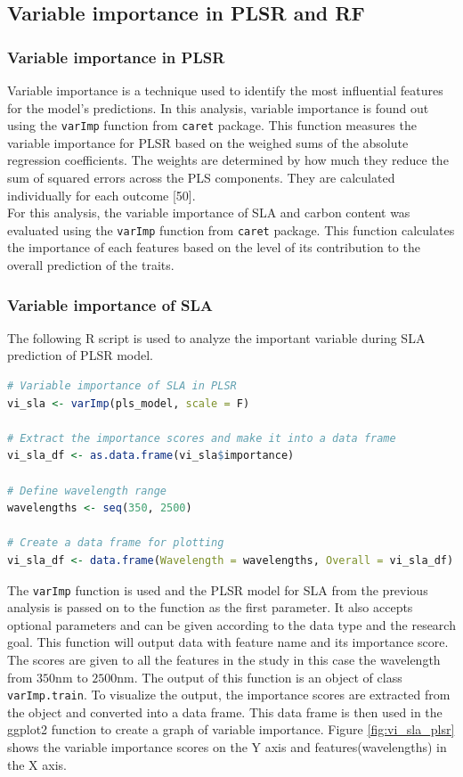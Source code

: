 \documentclass[12pt,a4paper]{report}
\begin{document}
\subsection{Variable importance in PLSR and RF}
\subsubsection*{Variable importance in PLSR}
Variable importance is a technique used to identify the most influential features for the model's predictions. In this analysis, variable importance is found out using the \texttt{varImp} function from \texttt{caret} package. This function measures the variable importance for PLSR based on the weighed sums of the absolute regression coefficients. The weights are determined by how much they reduce the sum of squared errors across the PLS components. They are calculated individually for each outcome [50].\\

For this analysis, the variable importance of SLA and carbon content was evaluated using the \texttt{varImp} function from \texttt{caret} package. This function calculates the importance of each features based on the level of its contribution to the overall prediction of the traits. \\ 

\subsubsection*{Variable importance of SLA}
The following R script is used to analyze the important variable during SLA prediction of PLSR model. \\

\begin{lstlisting}[language=R, style=mystyle]
# Variable importance of SLA in PLSR
vi_sla <- varImp(pls_model, scale = F)

# Extract the importance scores and make it into a data frame
vi_sla_df <- as.data.frame(vi_sla$importance)

# Define wavelength range
wavelengths <- seq(350, 2500)

# Create a data frame for plotting
vi_sla_df <- data.frame(Wavelength = wavelengths, Overall = vi_sla_df)
\end{lstlisting}

The \texttt{varImp} function is used and the PLSR model for SLA from the previous analysis is passed on to the function as the first parameter. It also accepts optional parameters and can be given according to the data type and the research goal. This function will output data with feature name and its importance score. The scores are given to all the features in the study in this case the wavelength from $350$nm to $2500$nm. The output of this function is an object of class \texttt{varImp.train}. To visualize the output, the importance scores are extracted from the object and converted into a data frame. This data frame is then used in the ggplot2 function to create a graph of variable importance. Figure \ref{fig:vi_sla_plsr} shows the variable importance scores on the Y axis and features(wavelengths) in the X axis.  \\
\end{document}
